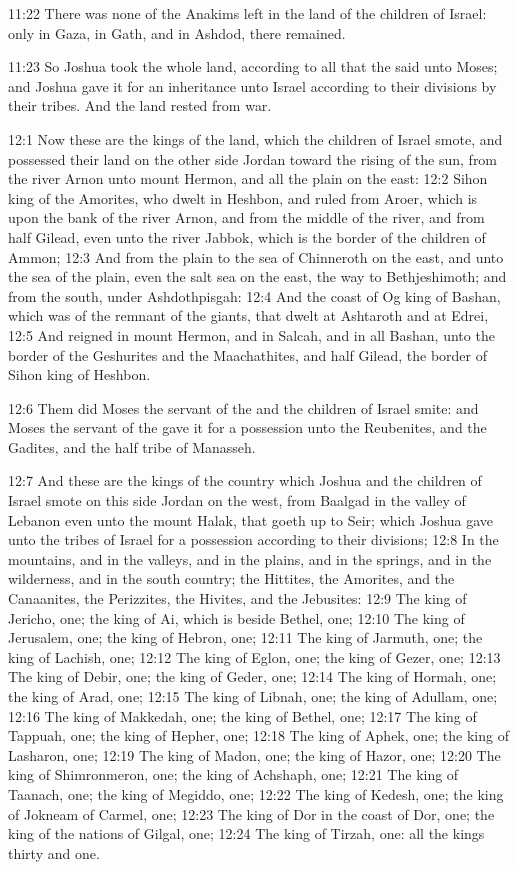11:22 There was none of the Anakims left in the land of the children of Israel: only in Gaza, in Gath, and in Ashdod, there remained.

11:23 So Joshua took the whole land, according to all that the \LORD said unto Moses; and Joshua gave it for an inheritance unto Israel according to their divisions by their tribes. And the land rested from war.

12:1 Now these are the kings of the land, which the children of Israel smote, and possessed their land on the other side Jordan toward the rising of the sun, from the river Arnon unto mount Hermon, and all the plain on the east: 12:2 Sihon king of the Amorites, who dwelt in Heshbon, and ruled from Aroer, which is upon the bank of the river Arnon, and from the middle of the river, and from half Gilead, even unto the river Jabbok, which is the border of the children of Ammon; 12:3 And from the plain to the sea of Chinneroth on the east, and unto the sea of the plain, even the salt sea on the east, the way to Bethjeshimoth; and from the south, under Ashdothpisgah: 12:4 And the coast of Og king of Bashan, which was of the remnant of the giants, that dwelt at Ashtaroth and at Edrei, 12:5 And reigned in mount Hermon, and in Salcah, and in all Bashan, unto the border of the Geshurites and the Maachathites, and half Gilead, the border of Sihon king of Heshbon.

12:6 Them did Moses the servant of the \LORD and the children of Israel smite: and Moses the servant of the \LORD gave it for a possession unto the Reubenites, and the Gadites, and the half tribe of Manasseh.

12:7 And these are the kings of the country which Joshua and the children of Israel smote on this side Jordan on the west, from Baalgad in the valley of Lebanon even unto the mount Halak, that goeth up to Seir; which Joshua gave unto the tribes of Israel for a possession according to their divisions; 12:8 In the mountains, and in the valleys, and in the plains, and in the springs, and in the wilderness, and in the south country; the Hittites, the Amorites, and the Canaanites, the Perizzites, the Hivites, and the Jebusites: 12:9 The king of Jericho, one; the king of Ai, which is beside Bethel, one; 12:10 The king of Jerusalem, one; the king of Hebron, one; 12:11 The king of Jarmuth, one; the king of Lachish, one; 12:12 The king of Eglon, one; the king of Gezer, one; 12:13 The king of Debir, one; the king of Geder, one; 12:14 The king of Hormah, one; the king of Arad, one; 12:15 The king of Libnah, one; the king of Adullam, one; 12:16 The king of Makkedah, one; the king of Bethel, one; 12:17 The king of Tappuah, one; the king of Hepher, one; 12:18 The king of Aphek, one; the king of Lasharon, one; 12:19 The king of Madon, one; the king of Hazor, one; 12:20 The king of Shimronmeron, one; the king of Achshaph, one; 12:21 The king of Taanach, one; the king of Megiddo, one; 12:22 The king of Kedesh, one; the king of Jokneam of Carmel, one; 12:23 The king of Dor in the coast of Dor, one; the king of the nations of Gilgal, one; 12:24 The king of Tirzah, one: all the kings thirty and one.


